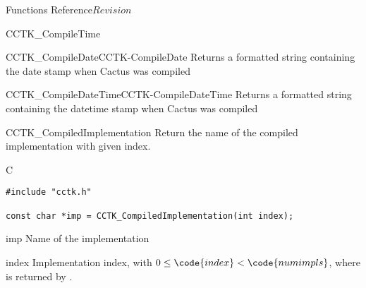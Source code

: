 \begin{cactuspart}{ Functions Reference}{}{$Revision$}
\begin{FunctionDescription}{CCTK\_CompileTime}
\begin{SeeAlsoSection}
\begin{SeeAlso2}{CCTK\_CompileDate}{CCTK-CompileDate}
  Returns a formatted string containing the date stamp when Cactus was compiled
\end{SeeAlso2}
\begin{SeeAlso2}{CCTK\_CompileDateTime}{CCTK-CompileDateTime}
  Returns a formatted string containing the datetime stamp when Cactus was compiled
\end{SeeAlso2}
\end{SeeAlsoSection}
\end{FunctionDescription}


\begin{FunctionDescription}{CCTK\_CompiledImplementation}
\label{CCTK-CompiledImplementation}
Return the name of the compiled implementation with given index.

\begin{SynopsisSection}
\begin{Synopsis}{C}
\begin{verbatim}
#include "cctk.h"

const char *imp = CCTK_CompiledImplementation(int index);
\end{verbatim}
\end{Synopsis}
\end{SynopsisSection}

\begin{ResultSection}
\begin{Result}{imp}
Name of the implementation
\end{Result}
\end{ResultSection}

\begin{ParameterSection}
\begin{Parameter}{index}
Implementation index, with $0 \le \code{index} < \code{numimpls}$,
where  is returned by
.
\end{Parameter}
\end{ParameterSection}


\end{FunctionDescription}
\end{cactuspart}
